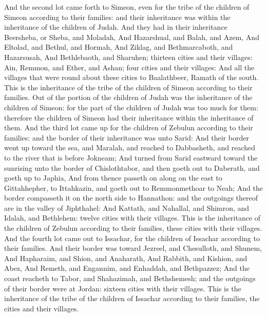 \begin{biblechapter} %
 And the second lot came forth to Simeon, even for the tribe of the children of Simeon according to their families: and their inheritance was within the inheritance of the children of Judah.
\verse And they had in their inheritance Beersheba, or Sheba, and Moladah,
\verse And Hazarshual, and Balah, and Azem,
\verse And Eltolad, and Bethul, and Hormah,
\verse And Ziklag, and Bethmarcaboth, and Hazarsusah,
\verse And Bethlebaoth, and Sharuhen; thirteen cities and their villages:
\verse Ain, Remmon, and Ether, and Ashan; four cities and their villages:
\verse And all the villages that were round about these cities to Baalathbeer, Ramath of the south. This is the inheritance of the tribe of the children of Simeon according to their families.
\verse Out of the portion of the children of Judah was the inheritance of the children of Simeon: for the part of the children of Judah was too much for them: therefore the children of Simeon had their inheritance within the inheritance of them.
 And the third lot came up for the children of Zebulun according to their families: and the border of their inheritance was unto Sarid:
\verse And their border went up toward the sea, and Maralah, and reached to Dabbasheth, and reached to the river that is before Jokneam;
\verse And turned from Sarid eastward toward the sunrising unto the border of Chislothtabor, and then goeth out to Daberath, and goeth up to Japhia,
\verse And from thence passeth on along on the east to Gittahhepher, to Ittahkazin, and goeth out to Remmonmethoar to Neah;
\verse And the border compasseth it on the north side to Hannathon: and the outgoings thereof are in the valley of Jiphthahel:
\verse And Kattath, and Nahallal, and Shimron, and Idalah, and Bethlehem: twelve cities with their villages.
\verse This is the inheritance of the children of Zebulun according to their families, these cities with their villages.
 And the fourth lot came out to Issachar, for the children of Issachar according to their families.
\verse And their border was toward Jezreel, and Chesulloth, and Shunem,
\verse And Hapharaim, and Shion, and Anaharath,
\verse And Rabbith, and Kishion, and Abez,
\verse And Remeth, and Engannim, and Enhaddah, and Bethpazzez;
\verse And the coast reacheth to Tabor, and Shahazimah, and Bethshemesh; and the outgoings of their border were at Jordan: sixteen cities with their villages.
\verse This is the inheritance of the tribe of the children of Issachar according to their families, the cities and their villages.

\end{biblechapter}
